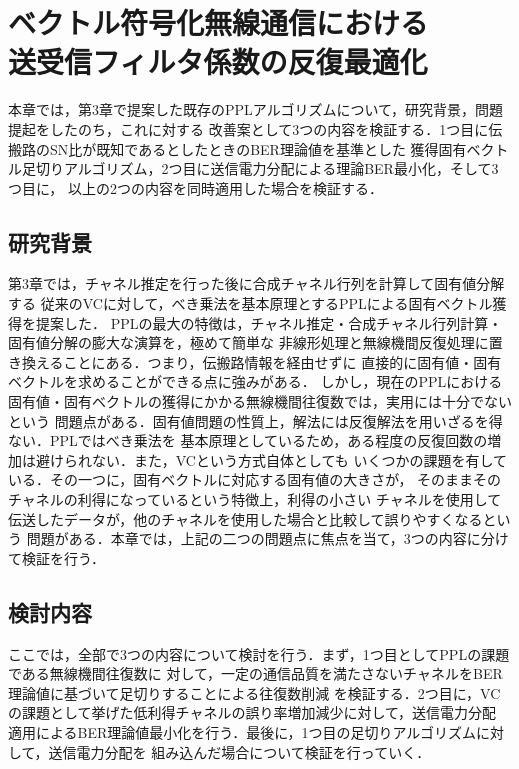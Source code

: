 \chapter{ベクトル符号化無線通信における\\送受信フィルタ係数の反復最適化
}
本章では，第3章で提案した既存のPPLアルゴリズムについて，研究背景，問題提起をしたのち，これに対する
改善案として3つの内容を検証する．1つ目に伝搬路のSN比が既知であるとしたときのBER理論値を基準とした
獲得固有ベクトル足切りアルゴリズム，2つ目に送信電力分配による理論BER最小化，そして3つ目に，
以上の2つの内容を同時適用した場合を検証する．

\section{研究背景}
第3章では，チャネル推定を行った後に合成チャネル行列を計算して固有値分解する
従来のVCに対して，べき乗法を基本原理とするPPLによる固有ベクトル獲得を提案した．
PPLの最大の特徴は，チャネル推定・合成チャネル行列計算・固有値分解の膨大な演算を，極めて簡単な
非線形処理と無線機間反復処理に置き換えることにある．つまり，伝搬路情報を経由せずに
直接的に固有値・固有ベクトルを求めることができる点に強みがある．
しかし，現在のPPLにおける固有値・固有ベクトルの獲得にかかる無線機間往復数では，実用には十分でないという
問題点がある．固有値問題の性質上，解法には反復解法を用いざるを得ない．PPLではべき乗法を
基本原理としているため，ある程度の反復回数の増加は避けられない．また，VCという方式自体としても
いくつかの課題を有している．その一つに，固有ベクトルに対応する固有値の大きさが，
そのままそのチャネルの利得になっているという特徴上，利得の小さい
チャネルを使用して伝送したデータが，他のチャネルを使用した場合と比較して誤りやすくなるという
問題がある．本章では，上記の二つの問題点に焦点を当て，3つの内容に分けて検証を行う．

\section{検討内容}
ここでは，全部で3つの内容について検討を行う．まず，1つ目としてPPLの課題である無線機間往復数に
対して，一定の通信品質を満たさないチャネルをBER理論値に基づいて足切りすることによる往復数削減
を検証する．2つ目に，VCの課題として挙げた低利得チャネルの誤り率増加減少に対して，送信電力分配
適用によるBER理論値最小化を行う．最後に，1つ目の足切りアルゴリズムに対して，送信電力分配を
組み込んだ場合について検証を行っていく．

